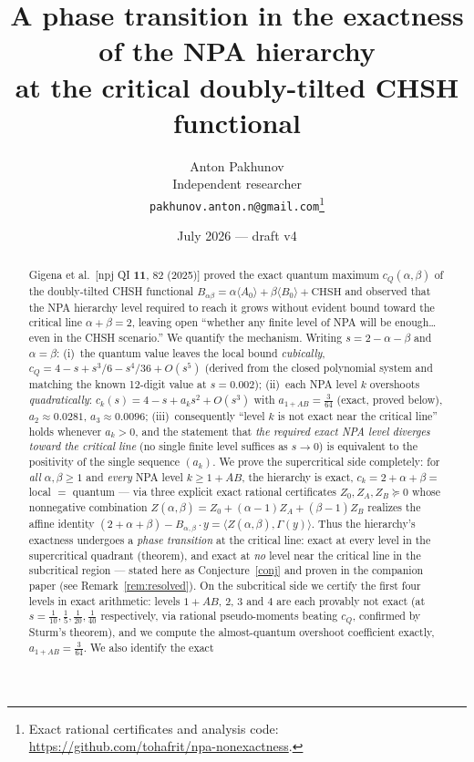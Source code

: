 \documentclass[11pt]{article}
\title{A phase transition in the exactness of the NPA hierarchy\\
at the critical doubly-tilted CHSH functional}
\author{Anton Pakhunov\\ \small Independent researcher\\ \small \texttt{pakhunov.anton.n@gmail.com}\thanks{Exact rational certificates and analysis code: \url{https://github.com/tohafrit/npa-nonexactness}.}}
\date{July 2026 --- draft v4}
\begin{document}
\maketitle

\begin{abstract}
Gigena et al.\ [npj QI \textbf{11}, 82 (2025)] proved the exact quantum maximum
$c_Q(\alpha,\beta)$ of the doubly-tilted CHSH functional
$B_{\alpha\beta}=\alpha\langle A_0\rangle+\beta\langle B_0\rangle+\mathrm{CHSH}$
and observed that the NPA hierarchy level required to reach it grows without
evident bound toward the critical line $\alpha+\beta=2$, leaving open
``whether any finite level of NPA will be enough\ldots even in the CHSH
scenario.'' We quantify the mechanism. Writing $s=2-\alpha-\beta$ and
$\alpha=\beta$: (i)~the quantum value leaves the local bound \emph{cubically},
$c_Q=4-s+s^3/6-s^4/36+O(s^5)$ (derived from the closed polynomial system and
matching the known 12-digit value at $s=0.002$); (ii)~each NPA level $k$
overshoots \emph{quadratically}: $c_k(s)=4-s+a_ks^2+O(s^3)$ with
$a_{1+AB}=\tfrac{3}{64}$ (exact, proved below), $a_2\approx0.0281$,
$a_3\approx0.0096$; (iii)~consequently
``level $k$ is not exact near the critical line'' holds whenever $a_k>0$, and the
statement that \emph{the required exact NPA level diverges toward the critical line}
(no single finite level suffices as $s\to0$) is equivalent to the positivity of the
single sequence $(a_k)$. We prove the
supercritical side completely: for \emph{all} $\alpha,\beta\ge1$ and
\emph{every} NPA level $k\ge1{+}AB$, the hierarchy is exact,
$c_k=2+\alpha+\beta=$ local $=$ quantum --- via three explicit exact rational
certificates $Z_0,Z_A,Z_B\succeq0$ whose nonnegative combination
$Z(\alpha,\beta)=Z_0+(\alpha-1)Z_A+(\beta-1)Z_B$ realizes the affine identity
$(2+\alpha+\beta)-B_{\alpha,\beta}\cdot y=\langle Z(\alpha,\beta),\Gamma(y)\rangle$.
Thus the hierarchy's exactness undergoes a \emph{phase transition} at the
critical line: exact at every level in the supercritical quadrant (theorem),
and exact at \emph{no} level near the critical line in the subcritical region
--- stated here as Conjecture~\ref{conj} and proven in the companion paper
\cite{proof} (see Remark~\ref{rem:resolved}). On the
subcritical side we certify the first four levels in exact arithmetic: levels
$1{+}AB$, $2$, $3$ and $4$ are each provably not exact (at $s=\tfrac1{10},\tfrac15,
\tfrac1{20},\tfrac1{40}$ respectively, via rational pseudo-moments beating $c_Q$,
confirmed by Sturm's theorem), and we compute the almost-quantum overshoot
coefficient exactly, $a_{1+AB}=\tfrac3{64}$. We also identify the exact

\end{abstract}
\end{document}
